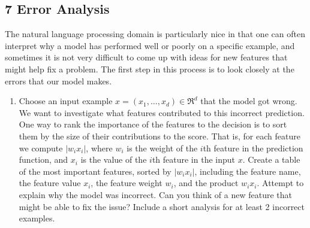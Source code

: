 \documentclass[11pt]{article}
\providecommand{\tightlist}{%
      \setlength{\itemsep}{0pt}\setlength{\parskip}{0pt}}
\begin{document}
    \hypertarget{error-analysis}{%
\subsection{7 Error Analysis}\label{error-analysis}}

The natural language processing domain is particularly nice in that one
can often interpret why a model has performed well or poorly on a
specific example, and sometimes it is not very difficult to come up with
ideas for new features that might help fix a problem. The first step in
this process is to look closely at the errors that our model makes.

\begin{enumerate}
\def\labelenumi{\arabic{enumi}.}
\tightlist
\item
  Choose an input example
  \(x=\left(x_{1},\ldots,x_{d}\right)\in\Re^{d}\) that the model got
  wrong. We want to investigate what features contributed to this
  incorrect prediction. One way to rank the importance of the features
  to the decision is to sort them by the size of their contributions to
  the score. That is, for each feature we compute
  \(\left|w_{i}x_{i}\right|\), where \(w_{i}\) is the weight of the
  \(i\)th feature in the prediction function, and \(x_{i}\) is the value
  of the \(i\)th feature in the input \(x\). Create a table of the most
  important features, sorted by \(\left|w_{i}x_{i}\right|\), including
  the feature name, the feature value \(x_{i}\), the feature weight
  \(w_{i}\), and the product \(w_{i}x_{i}\). Attempt to explain why the
  model was incorrect. Can you think of a new feature that might be able
  to fix the issue? Include a short analysis for at least 2 incorrect
  examples.
\end{enumerate}
\end{document}

